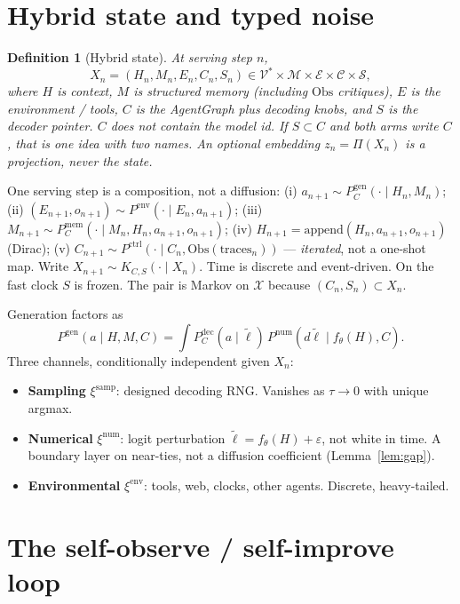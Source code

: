 \documentclass{article}
\newtheorem{definition}{Definition}
\begin{document}
\section{Hybrid state and typed noise}
\label{sec:hybrid}

\begin{definition}[Hybrid state]
At serving step \(n\),
\[
X_n=(H_n,M_n,E_n,C_n,S_n)\in\mathcal{V}^*\times\mathcal{M}\times\mathcal{E}\times\mathcal{C}\times\mathcal{S},
\]
where \(H\) is context, \(M\) is structured memory (including \(\mathrm{Obs}\) critiques), \(E\) is the environment / tools, \(C\) is the AgentGraph plus decoding knobs, and \(S\) is the decoder pointer. \(C\) does not contain the model id. If \(S\subset C\) and both arms write \(C\), that is one idea with two names. An optional embedding \(z_n=\Pi(X_n)\) is a projection, never the state.
\end{definition}

One serving step is a composition, not a diffusion:
(i) \(a_{n+1}\sim P^{\mathrm{gen}}_C(\cdot\mid H_n,M_n)\);
(ii) \((E_{n+1},o_{n+1})\sim P^{\mathrm{env}}(\cdot\mid E_n,a_{n+1})\);
(iii) \(M_{n+1}\sim P^{\mathrm{mem}}_C(\cdot\mid M_n,H_n,a_{n+1},o_{n+1})\);
(iv) \(H_{n+1}=\mathrm{append}(H_n,a_{n+1},o_{n+1})\) (Dirac);
(v) \(C_{n+1}\sim P^{\mathrm{ctrl}}(\cdot\mid C_n,\mathrm{Obs}(\mathrm{traces}_n))\) --- \emph{iterated}, not a one-shot map.
Write \(X_{n+1}\sim K_{C,S}(\cdot\mid X_n)\). Time is discrete and event-driven. On the fast clock \(S\) is frozen. The pair is Markov on \(\mathcal{X}\) because \((C_n,S_n)\subset X_n\).

Generation factors as
\[
P^{\mathrm{gen}}(a\mid H,M,C)=\int P^{\mathrm{dec}}_C(a\mid \tilde\ell)\,P^{\mathrm{num}}(d\tilde\ell\mid f_\theta(H),C).
\]
Three channels, conditionally independent given \(X_n\):
\begin{itemize}
\item \textbf{Sampling} \(\xi^{\mathrm{samp}}\): designed decoding RNG. Vanishes as \(\tau\to 0\) with unique argmax.
\item \textbf{Numerical} \(\xi^{\mathrm{num}}\): logit perturbation \(\tilde\ell=f_\theta(H)+\varepsilon\), not white in time. A boundary layer on near-ties, not a diffusion coefficient (Lemma~\ref{lem:gap}).
\item \textbf{Environmental} \(\xi^{\mathrm{env}}\): tools, web, clocks, other agents. Discrete, heavy-tailed.
\end{itemize}

\section{The self-observe / self-improve loop}
\label{sec:obs}
\end{document}
